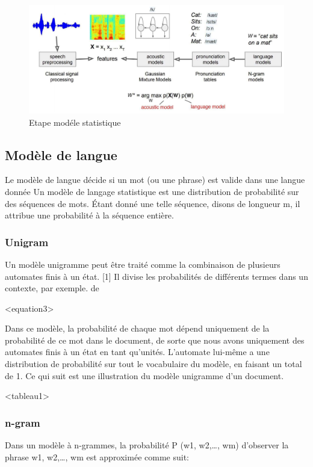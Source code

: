 \documentclass[a4paper, 12pt]{book}
\begin{document}
\begin{figure}[htbp]
  \centering
  \includegraphics[width=1\linewidth]{fig/model.png}
  \caption{Etape modéle statistique}
\end{figure}

\subsection{Modèle de langue}

Le modèle de langue décide si un mot (ou une phrase) est valide dans une langue donnée Un modèle de langage statistique est une distribution de probabilité sur des séquences de mots. Étant donné une telle séquence, disons de longueur m, il attribue une probabilité à la séquence entière.

\subsubsection{Unigram}

Un modèle unigramme peut être traité comme la combinaison de plusieurs automates finis à un état. [1] Il divise les probabilités de différents termes dans un contexte, par exemple. de

<equation3>

Dans ce modèle, la probabilité de chaque mot dépend uniquement de la probabilité de ce mot dans le document, de sorte que nous avons uniquement des automates finis à un état en tant qu'unités. L'automate lui-même a une distribution de probabilité sur tout le vocabulaire du modèle, en faisant un total de 1. Ce qui suit est une illustration du modèle unigramme d'un document.

<tableau1>

\subsubsection{n-gram}

Dans un modèle à n-grammes, la probabilité P (w1, w2,…, wm) d’observer la phrase w1, w2,…, wm est approximée comme suit:
\end{document}
